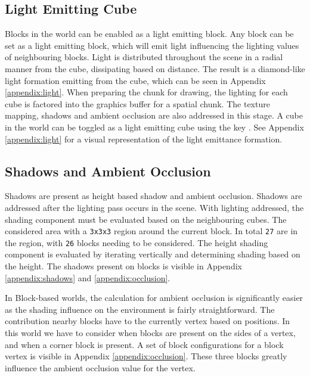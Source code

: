 \documentclass[a4paper,11pt,titlepage]{scrartcl}
\begin{document}
\subsection{Light Emitting Cube}
Blocks in the world can be enabled as a light emitting block.  Any block can be set as a light emitting block, which will emit light influencing the lighting values of neighbouring blocks.  Light is distributed throughout the scene in a radial manner from the cube, dissipating based on distance.  The result is a diamond-like light formation emitting from the cube, which can be seen in Appendix \ref{appendix:light}.  When preparing the chunk for drawing, the lighting for each cube is factored into the graphics buffer for a spatial chunk.  The texture mapping, shadows and ambient occlusion are also addressed in this stage.  
\vskip 2.5mm\noindent
A cube in the world can be toggled as a light emitting cube using the key .  See Appendix \ref{appendix:light} for a visual representation of the light emittance formation.
    
\subsection{Shadows and Ambient Occlusion}
Shadows are present as height based shadow and ambient occlusion.  Shadows are addressed after the lighting pass occurs in the scene.  With lighting addressed, the shading component must be evaluated based on the neighbouring cubes.  The considered area with a \texttt{3x3x3} region around the current block.  In total \texttt{27} are in the region, with \texttt{26} blocks needing to be considered.  The height shading component is evaluated by iterating vertically and determining shading based on the height.  The shadows present on blocks is visible in Appendix \ref{appendix:shadows} and \ref{appendix:occlusion}.

In Block-based worlds, the calculation for ambient occlusion is significantly easier as the shading influence on the environment is fairly straightforward.  The contribution nearby blocks have to the currently vertex based on positions.  In this world we have to consider when blocks are present on the sides of a vertex, and when a corner block is present.  A set of block configurations for a block vertex is visible in Appendix \ref{appendix:occlusion}.  These three blocks greatly influence the ambient occlusion value for the vertex.

\end{document}
